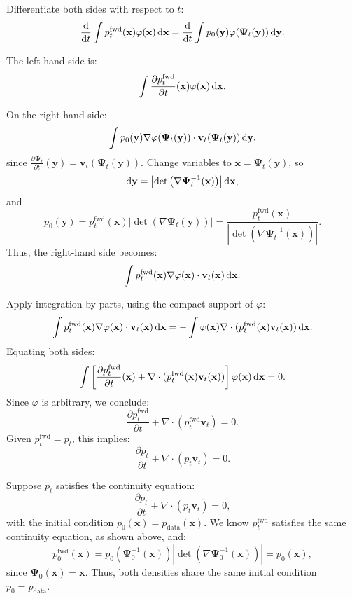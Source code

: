 Differentiate both sides with respect to $ t $:
\[
\frac{\mathop{}\!\mathrm{d}}{\mathop{}\!\mathrm{d} t} \int p_t^{\mathrm{fwd}}(\mathbf{x}) \varphi(\mathbf{x}) \mathop{}\!\mathrm{d}\mathbf{x} = \frac{\mathop{}\!\mathrm{d}}{\mathop{}\!\mathrm{d} t} \int p_0(\mathbf{y}) \varphi(\bm{\Psi}_t(\mathbf{y})) \mathop{}\!\mathrm{d}\mathbf{y}.
\]

The left-hand side is:
\[
\int \frac{\partial p_t^{\mathrm{fwd}}}{\partial t}(\mathbf{x}) \varphi(\mathbf{x}) \mathop{}\!\mathrm{d}\mathbf{x}.
\]

On the right-hand side:
\[
\int p_0(\mathbf{y}) \nabla \varphi(\bm{\Psi}_t(\mathbf{y})) \cdot \mathbf{v}_t(\bm{\Psi}_t(\mathbf{y})) \mathop{}\!\mathrm{d}\mathbf{y},
\]
since $ \frac{\partial \bm{\Psi}_t}{\partial t}(\mathbf{y}) = \mathbf{v}_t(\bm{\Psi}_t(\mathbf{y})) $.
Change variables to $ \mathbf{x} = \bm{\Psi}_t(\mathbf{y}) $, so 
\[
\mathop{}\!\mathrm{d}\mathbf{y} = \left| \det\left( \nabla \bm{\Psi}_t^{-1}(\mathbf{x}) \right) \right| \mathop{}\!\mathrm{d}\mathbf{x} ,
\]
 and
\[
p_0(\mathbf{y}) = p_t^{\mathrm{fwd}}(\mathbf{x}) \left| \det\left( \nabla \bm{\Psi}_t(\mathbf{y}) \right) \right| = \frac{p_t^{\mathrm{fwd}}(\mathbf{x})}{\left| \det\left( \nabla \bm{\Psi}_t^{-1}(\mathbf{x}) \right) \right|}.
\]
Thus, the right-hand side becomes:
\[
\int p_t^{\mathrm{fwd}}(\mathbf{x}) \nabla \varphi(\mathbf{x}) \cdot \mathbf{v}_t(\mathbf{x}) \mathop{}\!\mathrm{d}\mathbf{x}.
\]

Apply integration by parts, using the compact support of $ \varphi $:
\[
\int p_t^{\mathrm{fwd}}(\mathbf{x}) \nabla \varphi(\mathbf{x}) \cdot \mathbf{v}_t(\mathbf{x}) \mathop{}\!\mathrm{d}\mathbf{x} = -\int \varphi(\mathbf{x}) \nabla \cdot (p_t^{\mathrm{fwd}}(\mathbf{x}) \mathbf{v}_t(\mathbf{x})) \mathop{}\!\mathrm{d}\mathbf{x}.
\]
Equating both sides:
\[
\int \left[ \frac{\partial p_t^{\mathrm{fwd}}}{\partial t}(\mathbf{x}) + \nabla \cdot (p_t^{\mathrm{fwd}}(\mathbf{x}) \mathbf{v}_t(\mathbf{x})) \right] \varphi(\mathbf{x}) \mathop{}\!\mathrm{d}\mathbf{x} = 0.
\]
Since $ \varphi $ is arbitrary, we conclude:
\[
\frac{\partial p_t^{\mathrm{fwd}}}{\partial t} + \nabla \cdot (p_t^{\mathrm{fwd}} \mathbf{v}_t) = 0.
\]
Given $ p_t^{\mathrm{fwd}} = p_t $, this implies:
\[
\frac{\partial p_t}{\partial t} + \nabla \cdot (p_t \mathbf{v}_t) = 0.
\]


 Suppose $ p_t $ satisfies the continuity equation:
\[
\frac{\partial p_t}{\partial t} + \nabla \cdot (p_t \mathbf{v}_t) = 0,
\]
with the initial condition $ p_0(\mathbf{x}) = p_{\mathrm{data}}(\mathbf{x}) $. We know $ p_t^{\mathrm{fwd}} $ satisfies the same continuity equation, as shown above, and:
\[
p_0^{\mathrm{fwd}}(\mathbf{x}) = p_0(\bm{\Psi}_0^{-1}(\mathbf{x})) \left| \det\left( \nabla \bm{\Psi}_0^{-1}(\mathbf{x}) \right) \right| = p_0(\mathbf{x}),
\]
since $ \bm{\Psi}_0(\mathbf{x}) = \mathbf{x} $. Thus, both densities share the same initial condition $ p_0 = p_{\mathrm{data}} $.

